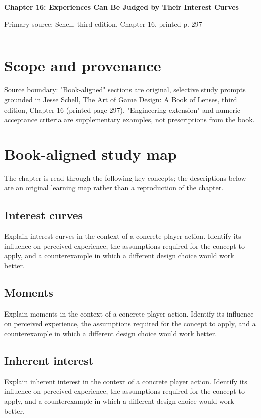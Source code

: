 \documentclass[11pt]{article}
\begin{document}
{\huge\bfseries\color{suiteblue} Chapter 16: Experiences Can Be Judged by Their Interest Curves}\par
\vspace{0.15in}
{\normalsize\color{suitegray} Primary source: Schell, third edition, Chapter 16, printed p. 297}\par
\vspace{0.15in}\hrule\vspace{0.15in}

\section{Scope and provenance}
Source boundary: "Book-aligned" sections are original, selective study prompts grounded in Jesse Schell, The Art of Game Design: A Book of Lenses, third edition, Chapter 16 (printed page 297). "Engineering extension" and numeric acceptance criteria are supplementary examples, not prescriptions from the book.


\section{Book-aligned study map}
The chapter is read through the following key concepts; the descriptions below are an original learning map rather than a reproduction of the chapter.


\subsection{Interest curves}
Explain interest curves in the context of a concrete player action. Identify its influence on perceived experience, the assumptions required for the concept to apply, and a counterexample in which a different design choice would work better.


\subsection{Moments}
Explain moments in the context of a concrete player action. Identify its influence on perceived experience, the assumptions required for the concept to apply, and a counterexample in which a different design choice would work better.


\subsection{Inherent interest}
Explain inherent interest in the context of a concrete player action. Identify its influence on perceived experience, the assumptions required for the concept to apply, and a counterexample in which a different design choice would work better.
\end{document}

